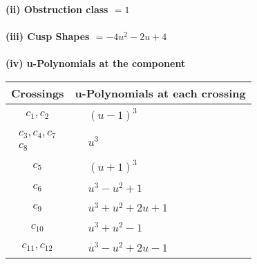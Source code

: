 \documentclass[1p]{elsarticle_modified}
\theoremstyle{definition}
\begin{document}
\flushleft \textbf{(ii) Obstruction class $= 1$}\\~\\
\flushleft \textbf{(iii) Cusp Shapes $= -4 u^2-2 u+4$}\\~\\
\newpage\renewcommand{\arraystretch}{1}
\flushleft \textbf{(iv) u-Polynomials at the component}\newline \\
\begin{tabular}{m{50pt}|m{274pt}}
Crossings & \hspace{64pt}u-Polynomials at each crossing \\
\hline $$\begin{aligned}c_{1},c_{2}\end{aligned}$$&$\begin{aligned}
&(u-1)^3
\end{aligned}$\\
\hline $$\begin{aligned}c_{3},c_{4},c_{7}\\c_{8}\end{aligned}$$&$\begin{aligned}
&u^3
\end{aligned}$\\
\hline $$\begin{aligned}c_{5}\end{aligned}$$&$\begin{aligned}
&(u+1)^3
\end{aligned}$\\
\hline $$\begin{aligned}c_{6}\end{aligned}$$&$\begin{aligned}
&u^3- u^2+1
\end{aligned}$\\
\hline $$\begin{aligned}c_{9}\end{aligned}$$&$\begin{aligned}
&u^3+u^2+2 u+1
\end{aligned}$\\
\hline $$\begin{aligned}c_{10}\end{aligned}$$&$\begin{aligned}
&u^3+u^2-1
\end{aligned}$\\
\hline $$\begin{aligned}c_{11},c_{12}\end{aligned}$$&$\begin{aligned}
&u^3- u^2+2 u-1
\end{aligned}$\\
\hline
\end{tabular}\\~\\
\end{document}

